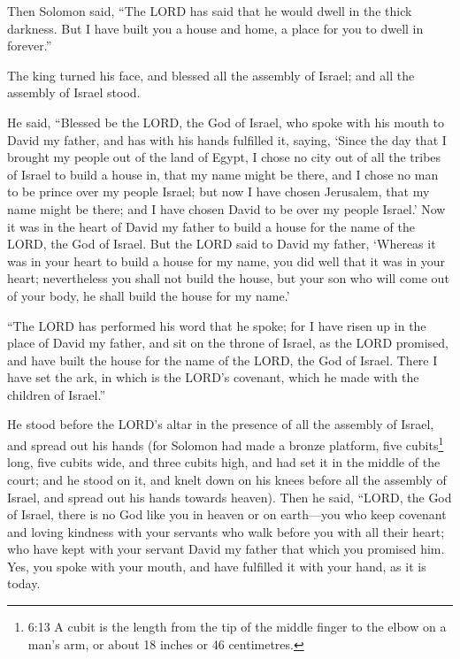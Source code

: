  Then Solomon said, ``The LORD has said that he would dwell
in the thick darkness.  But I have built you a house and
home, a place for you to dwell in forever.''

 The king turned his face, and blessed all the assembly of
Israel; and all the assembly of Israel stood.

 He said, ``Blessed be the LORD, the God of Israel, who
spoke with his mouth to David my father, and has with his hands
fulfilled it, saying,  `Since the day that I brought my
people out of the land of Egypt, I chose no city out of all the tribes
of Israel to build a house in, that my name might be there, and I chose
no man to be prince over my people Israel;  but now I have
chosen Jerusalem, that my name might be there; and I have chosen David
to be over my people Israel.'  Now it was in the heart of
David my father to build a house for the name of the LORD, the God of
Israel.  But the LORD said to David my father, `Whereas it
was in your heart to build a house for my name, you did well that it was
in your heart;  nevertheless you shall not build the house,
but your son who will come out of your body, he shall build the house
for my name.'

 ``The LORD has performed his word that he spoke; for I
have risen up in the place of David my father, and sit on the throne of
Israel, as the LORD promised, and have built the house for the name of
the LORD, the God of Israel.  There I have set the ark, in
which is the LORD's covenant, which he made with the children of
Israel.''

 He stood before the LORD's altar in the presence of all
the assembly of Israel, and spread out his hands  (for
Solomon had made a bronze platform, five cubits\footnote{6:13 A cubit is
  the length from the tip of the middle finger to the elbow on a man's
  arm, or about 18 inches or 46 centimetres.} long, five cubits wide,
and three cubits high, and had set it in the middle of the court; and he
stood on it, and knelt down on his knees before all the assembly of
Israel, and spread out his hands towards heaven).  Then he
said, ``LORD, the God of Israel, there is no God like you in heaven or
on earth---you who keep covenant and loving kindness with your servants
who walk before you with all their heart;  who have kept
with your servant David my father that which you promised him. Yes, you
spoke with your mouth, and have fulfilled it with your hand, as it is
today.

